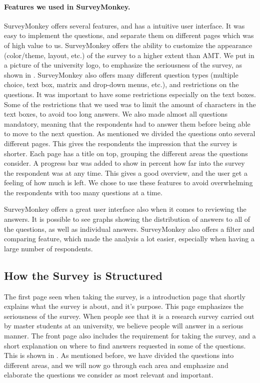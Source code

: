 \paragraph{Features we used in SurveyMonkey.}
SurveyMonkey offers several features, and has a intuitive user interface. It was easy to implement the questions, and separate them on different pages which was of high value to us. SurveyMonkey offers the ability to customize the appearance (color/theme, layout, etc.) of the survey to a higher extent than AMT. We put in a picture of the university logo, to emphasize the seriousness of the survey, as shown in . SurveyMonkey also offers many different question types (multiple choice, text box, matrix and drop-down menus, etc.), and restrictions on the questions. It was important to have some restrictions especially on the text boxes. Some of the restrictions that we used was to limit the amount of characters in the text boxes, to avoid too long answers. We also made almost all questions mandatory, meaning that the respondents had to answer them before being able to move to the next question. As mentioned we divided the questions onto several different pages. This gives the respondents the impression that the survey is shorter. Each page has a title on top, grouping the different areas the questions consider. A progress bar was added to show in percent how far into the survey the respondent was at any time. This gives a good overview, and the user get a feeling of how much is left. We chose to use these features to avoid overwhelming the respondents with too many questions at a time. 

SurveyMonkey offers a great user interface also when it comes to reviewing the answers. It is possible to see graphs showing the distribution of answers to all of the questions, as well as individual answers. SurveyMonkey also offers a filter and comparing feature, which made the analysis a lot easier, especially when having a large number of respondents. 

\subsection{How the Survey is Structured} 
The first page seen when taking the survey, is a introduction page that shortly explains what the survey is about, and it's purpose. This page emphasizes the seriousness of the survey. When people see that it is a research survey carried out by master students at an university, we believe people will answer in a serious manner. The front page also includes the requirement for taking the survey, and a short explanation on where to find answers requested in some of the questions. This is shown in . As mentioned before, we have divided the questions into different areas, and we will now go through each area and emphasize and elaborate the questions we consider as most relevant and important. 
 
